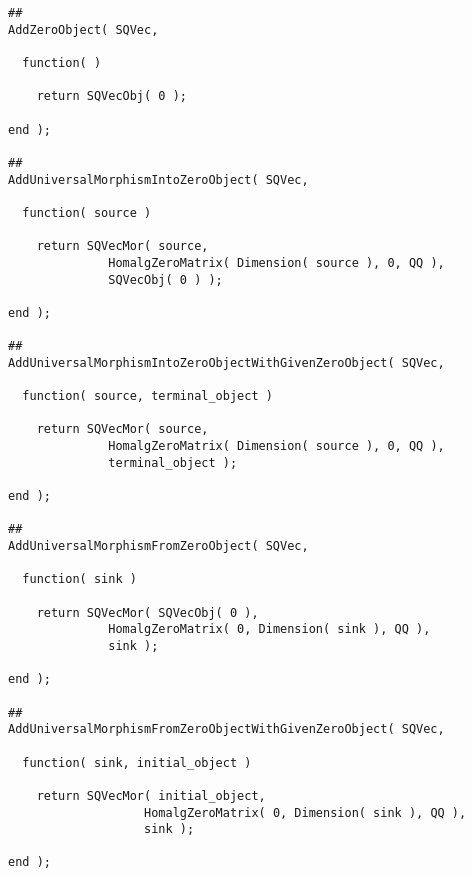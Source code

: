 \begin{small}
\begin{Verbatim}[frame=single]
##
AddZeroObject( SQVec,

  function( )

    return SQVecObj( 0 );

end );

##
AddUniversalMorphismIntoZeroObject( SQVec,

  function( source )

    return SQVecMor( source,
              HomalgZeroMatrix( Dimension( source ), 0, QQ ),
              SQVecObj( 0 ) );
    
end );

##
AddUniversalMorphismIntoZeroObjectWithGivenZeroObject( SQVec,

  function( source, terminal_object )

    return SQVecMor( source,
              HomalgZeroMatrix( Dimension( source ), 0, QQ ),
              terminal_object );
    
end );

##
AddUniversalMorphismFromZeroObject( SQVec,

  function( sink )
    
    return SQVecMor( SQVecObj( 0 ),
              HomalgZeroMatrix( 0, Dimension( sink ), QQ ),
              sink );
    
end );

##
AddUniversalMorphismFromZeroObjectWithGivenZeroObject( SQVec,

  function( sink, initial_object )
    
    return SQVecMor( initial_object,
                   HomalgZeroMatrix( 0, Dimension( sink ), QQ ),
                   sink );
    
end );
\end{Verbatim}
\end{small}